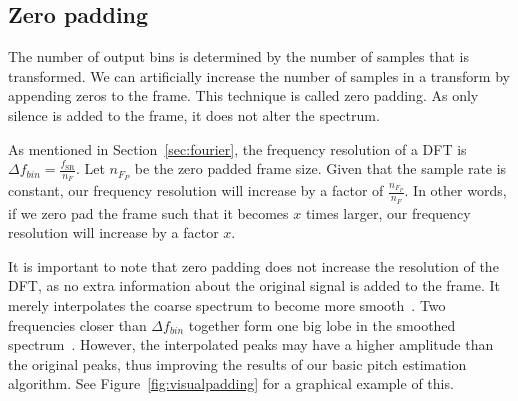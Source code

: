 \documentclass[a4paper,10pt,twocolumn]{article}
\begin{document}
\subsection{Zero padding}  \label{sec:zeropadding}
The number of output bins is determined by the number of samples that is transformed. We can artificially increase the number of samples in a transform by appending zeros to the frame. This technique is called zero padding. As only silence is added to the frame, it does not alter the spectrum.

As mentioned in Section~\ref{sec:fourier}, the frequency resolution of a DFT is $\Delta f_{bin} = \frac{f_{\text{SR}}}{n_F}$. Let $n_{F_P}$ be the zero padded frame size. Given that the sample rate is constant, our frequency resolution will increase by a factor of $\frac{n_{F_P}}{n_F}$. In other words, if we zero pad the frame such that it becomes $x$ times larger, our frequency resolution will increase by a factor $x$.

It is important to note that zero padding does not increase the resolution of the DFT, as no extra information about the original signal is added to the frame. It merely interpolates the coarse spectrum to become more smooth~\cite{zeropad1}. Two frequencies closer than $\Delta f_{bin}$ together form one big lobe in the smoothed spectrum~\cite{zeropad2}. However, the interpolated peaks may have a higher amplitude than the original peaks, thus improving the results of our basic pitch estimation algorithm. See Figure~\ref{fig:visualpadding} for a graphical example of this.
\end{document}
